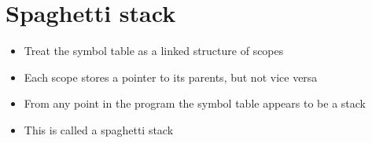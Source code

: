 \documentclass{article}[18pt]
\begin{document}
\section{Spaghetti stack}
\begin{itemize}
	\item Treat the symbol table as a linked structure of scopes
	\item Each scope stores a pointer to its parents, but not vice versa
	\item From any point in the program the symbol table appears to be a stack
	\item This is called a spaghetti stack
\end{itemize}
\end{document}
